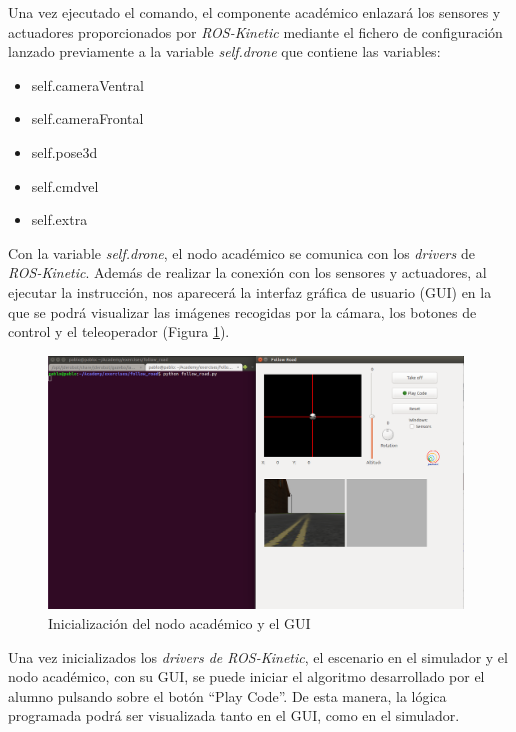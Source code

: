 Una vez ejecutado el comando, el componente académico enlazará los sensores y actuadores proporcionados por \textit{ROS-Kinetic} mediante el fichero de configuración lanzado previamente a la variable \textit{self.drone} que contiene las variables:

\begin{itemize}
    \item self.cameraVentral
    \item self.cameraFrontal
    \item self.pose3d
    \item self.cmdvel
    \item self.extra
\end{itemize}

Con la variable \textit{self.drone}, el nodo académico se comunica con los \textit{drivers} de \textit{ROS-Kinetic}.
Además de realizar la conexión con los sensores y actuadores, al ejecutar la instrucción, nos aparecerá la interfaz gráfica de usuario (GUI) en la que se podrá visualizar las imágenes recogidas por la cámara, los botones de control y el teleoperador (Figura \ref{fig.inaGfr}).

\begin{figure}[H]
  \begin{center}
    \includegraphics[width=0.98\textwidth]{figures/init_na_fr.png}
		\caption{Inicialización del nodo académico y el GUI}
		\label{fig.inaGfr}
		\end{center}
\end{figure}

Una vez inicializados los \textit{drivers de ROS-Kinetic}, el escenario en el simulador y el nodo académico, con su GUI, se puede iniciar el algoritmo desarrollado por el alumno pulsando sobre el botón ``Play Code''. De esta manera, la lógica programada podrá ser visualizada tanto en el GUI, como en el simulador.

